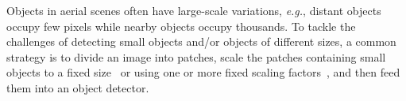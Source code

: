 \documentclass[letterpaper]{article} %
\def \eg {\emph{e.g.}}
\def \etal {\emph{et al. }}
\newcommand\rjf[1]{\textcolor{red}{\{RJF: #1\}}}
\begin{document}

Objects in aerial scenes often have large-scale variations, \eg, %
distant objects occupy few pixels while nearby objects occupy thousands. %
To tackle the challenges of detecting small objects and/or objects of different sizes, a common strategy is to divide an image into patches, scale the patches containing small objects to a fixed size~\cite{Deng_2021_GLSAN, Xu_2022_AdaZoom} or using one or more fixed scaling factors~\cite{Huang_2022_UFPMP}, and then feed them into an object detector. 
\end{document}
